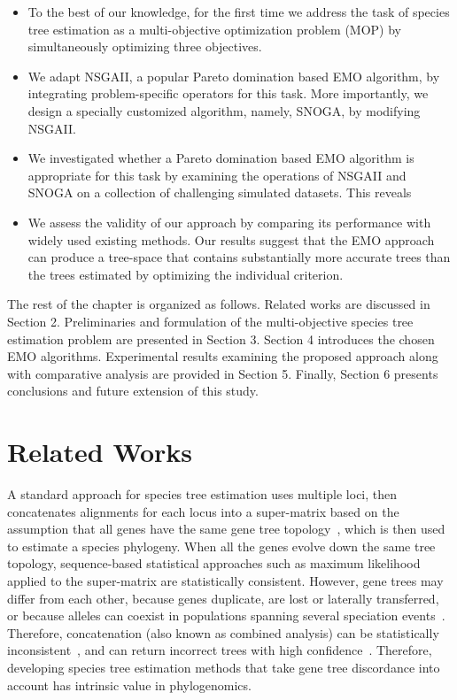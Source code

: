 \begin{itemize}
	\item To the best of our knowledge, for the first
	time we address the task of species tree estimation as a multi-objective optimization problem (MOP) by simultaneously optimizing three objectives. 
	
	\item We adapt NSGAII, a popular Pareto domination based EMO algorithm, by integrating problem-specific operators for this task. More importantly, we design a specially customized algorithm, namely, SNOGA, by modifying NSGAII.
	
	\item We investigated whether a Pareto domination based EMO algorithm is appropriate for this task by examining the operations of NSGAII and SNOGA on a collection of challenging simulated datasets. This reveals 
	
	\item We assess the validity of our approach by comparing its performance with widely used existing methods. Our results suggest that the EMO approach can produce a tree-space that contains substantially more accurate trees than the trees estimated by optimizing the individual criterion.
\end{itemize}

The rest of the chapter is organized as follows. Related works
are discussed in Section 2. Preliminaries and formulation
of the multi-objective species tree estimation problem are presented in Section 3. Section 4 introduces the chosen EMO algorithms. Experimental
results examining the proposed approach along with comparative analysis are provided in Section 5. Finally, Section 6 presents
conclusions and future extension of this study.





\section{Related Works}
A standard approach for species tree estimation uses multiple loci, then concatenates alignments for each locus
into a super-matrix based on the assumption that all genes have the same gene tree topology~\cite{huelsenbeck1996combining, de2007supermatrix}, which is then used to estimate a species phylogeny. When all the genes evolve down the same tree topology,  sequence-based statistical approaches such as maximum likelihood applied to the super-matrix are statistically consistent. 
However, gene trees may differ from each other, because genes duplicate, are lost or laterally transferred, or because alleles can coexist in populations spanning several speciation events~\cite{maddison1997gene}.
Therefore, concatenation (also known as combined analysis) can be statistically inconsistent~\cite{roch2015likelihood}, and can return incorrect trees with high confidence~\cite{kubatko-degnan-2007,edwards2007,leache-rannala,degiorgio2009}. Therefore, developing species tree estimation methods that take gene tree discordance into account has intrinsic value in phylogenomics.


